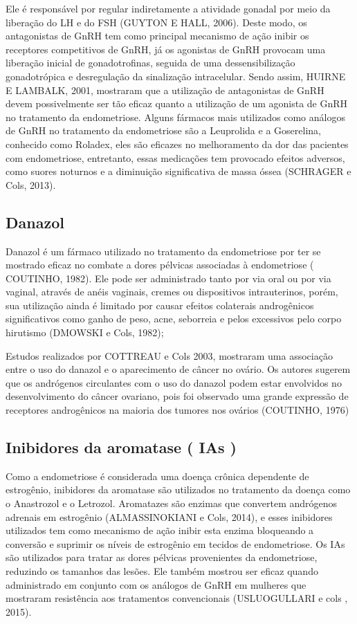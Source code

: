 \documentclass[12pt]{article} %
\begin{document}
Ele é responsável por regular indiretamente a atividade gonadal por
meio da liberação do LH e do FSH (GUYTON E HALL, 2006). Deste modo, os
antagonistas de GnRH tem como principal mecanismo de ação inibir os
receptores competitivos de GnRH, já os agonistas de GnRH provocam uma
liberação inicial de gonadotrofinas, seguida de uma dessensibilização
gonadotrópica e desregulação da sinalização intracelular. Sendo assim,
HUIRNE E LAMBALK, 2001, mostraram que a utilização de antagonistas de
GnRH devem possivelmente ser tão eficaz quanto a utilização de um
agonista de GnRH no tratamento da endometriose.  Alguns fármacos mais
utilizados como análogos de GnRH no tratamento da endometriose são a
Leuprolida e a Goserelina, conhecido como Roladex, eles são eficazes %
no melhoramento da dor das pacientes com endometriose, entretanto,
essas medicações tem provocado efeitos adversos, como suores noturnos
e a diminuição significativa de massa óssea (SCHRAGER e Cols, 2013).

\subsection{Danazol}

Danazol é um fármaco utilizado no tratamento da endometriose por ter
se mostrado eficaz no combate a dores pélvicas associadas à
endometriose ( COUTINHO, 1982). Ele pode ser administrado tanto por via oral ou por via
vaginal, através de anéis vaginais, cremes ou dispositivos
intrauterinos, porém, sua utilização ainda é limitado por causar
efeitos colaterais androgênicos significativos como ganho de peso,
acne, seborreia e pelos excessivos pelo corpo hirutismo (DMOWSKI e Cols, 1982);

Estudos realizados por COTTREAU e Cols 2003, mostraram uma associação
entre o uso do danazol e o aparecimento de câncer no ovário. Os
autores sugerem que os andrógenos circulantes com o uso do danazol
podem estar envolvidos no desenvolvimento do câncer ovariano, pois foi
observado uma grande expressão de receptores androgênicos na maioria
dos tumores nos ovários (COUTINHO, 1976)

\subsection{Inibidores da aromatase ( IAs )}

Como a endometriose é considerada uma doença crônica dependente de
estrogênio, inibidores da aromatase são utilizados no tratamento da
doença como o Anastrozol e o Letrozol. Aromatazes são enzimas que
convertem andrógenos adrenais em estrogênio (ALMASSINOKIANI e Cols,
2014), e esses inibidores utilizados tem como mecanismo de ação inibir
esta enzima bloqueando a conversão e suprimir os níveis de estrogênio
em tecidos de endometriose. Os IAs são utilizados para tratar as dores
pélvicas provenientes da endometriose, reduzindo os tamanhos das
lesões. Ele também mostrou ser eficaz quando administrado em conjunto
com os análogos de GnRH em mulheres que mostraram resistência aos
tratamentos convencionais (USLUOGULLARI e cols , 2015).
\end{document}
